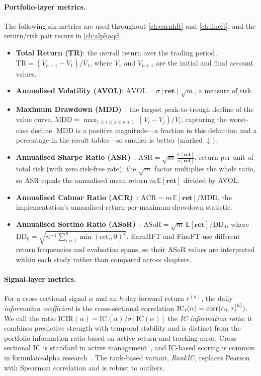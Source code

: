 \paragraph{Portfolio-layer metrics.} The following six metrics are used throughout \cref{ch:earnhft} and \cref{ch:fineft}, and the return/risk pair recurs in \cref{ch:alphaqd}.
\begin{itemize}
\item \textbf{Total Return (TR)}: the overall return over the trading period, $\mathrm{TR}=(V_{n+1}-V_1)/V_1$, where $V_1$ and $V_{n+1}$ are the initial and final account values.
\item \textbf{Annualised Volatility (AVOL)}: $\mathrm{AVOL}=\sigma[\mathbf{ret}]\,\sqrt{m}$, a measure of risk.
\item \textbf{Maximum Drawdown (MDD)}~\cite{magdon2004maximum}: the largest peak-to-trough decline of the value curve, $\mathrm{MDD}=\max_{1\le i\le j\le n+1}\,(V_i-V_j)/V_i$, capturing the worst-case decline. MDD is a positive magnitude---a fraction in this definition and a percentage in the result tables---so smaller is better (marked $\downarrow$).
\item \textbf{Annualised Sharpe Ratio (ASR)}~\cite{sharpe1994sharpe}: $\mathrm{ASR}=\sqrt{m}\,\frac{\mathbb{E}[\mathbf{ret}]}{\sigma[\mathbf{ret}]}$, return per unit of total risk (with zero risk-free rate); the $\sqrt{m}$ factor multiplies the whole ratio, so ASR equals the annualised mean return $m\,\mathbb{E}[\mathbf{ret}]$ divided by AVOL.
\item \textbf{Annualised Calmar Ratio (ACR)}~\cite{young1991calmar}: $\mathrm{ACR}=m\,\mathbb{E}[\mathbf{ret}]/\mathrm{MDD}$, the implementation's annualised-return-per-maximum-drawdown statistic.
\item \textbf{Annualised Sortino Ratio (ASoR)}~\cite{sortino1994performance}: $\mathrm{ASoR}=\sqrt{m}\,\mathbb{E}[\mathbf{ret}]/\mathrm{DD}_0$, where $\mathrm{DD}_0=\sqrt{n^{-1}\sum_{i=1}^{n}\min(\mathrm{ret}_i,0)^2}$. EarnHFT and FineFT use different return frequencies and evaluation spans, so their ASoR values are interpreted within each study rather than compared across chapters.
\end{itemize}

\paragraph{Signal-layer metrics.} For a cross-sectional signal $\alpha$ and an $h$-day forward return $r^{(h)}$, the daily \emph{information coefficient} is the cross-sectional correlation $\mathrm{IC}_t(\alpha)=\operatorname{corr}(\alpha_t,r^{(h)}_t)$. We call the ratio $\mathrm{ICIR}(\alpha)=\overline{\mathrm{IC}(\alpha)}/\sigma[\mathrm{IC}(\alpha)]$ the \emph{IC information ratio}; it combines predictive strength with temporal stability and is distinct from the portfolio information ratio based on active return and tracking error. Cross-sectional IC is standard in active management~\cite{grinold2000active}, and IC-based scoring is common in formulaic-alpha research~\cite{kakushadze2016101}. The rank-based variant, \emph{RankIC}, replaces Pearson with Spearman correlation and is robust to outliers.

